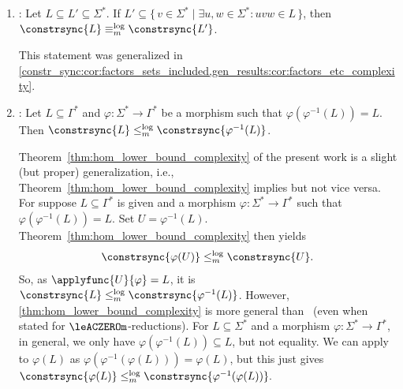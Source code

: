 \begin{enumerate}
	\item \cite[Thm.~15]{FernauGHHVW19}: Let $L\subseteq L'\subseteq\Sigma^*$. If  $L'\subseteq\{\,v\in \Sigma^*\mid \exists u,w \in \Sigma^*: uvw\in L\,\}$, then $\constrsync{L} \equiv^{\log}_m \constrsync{L'}$.
	
	This statement was generalized in \cref{constr_sync:cor:factors_sets_included,gen_results:cor:factors_etc_complexity}.
		
	\item \cite[Thm.~27]{FernauGHHVW19}:
	Let $L\subseteq\Gamma^*$ and $\varphi : \Sigma^* \to \Gamma^*$
	be a morphism such that $\varphi(\varphi^{-1}(L))=L$. Then
	$\constrsync{L} \leq^{\log}_m \constrsync{\varphi^{-1}(L)}$.
	
	Theorem~\ref{thm:hom_lower_bound_complexity} of the present work is a slight (but proper) generalization,
	i.e., Theorem~\ref{thm:hom_lower_bound_complexity} implies \cite[Thm.~27]{FernauGHHVW19}
	but not vice versa.
	For suppose $L \subseteq \Gamma^*$ is given and
	a morphism $\varphi : \Sigma^* \to \Gamma^*$
	such that $\varphi(\varphi^{-1}(L)) = L$.
	Set $U = \varphi^{-1}(L)$.
	Theorem~\ref{thm:hom_lower_bound_complexity}
	then yields
	\[
	\constrsync{\varphi(U)} \le_m^{\log} \constrsync{U}.
	\]
	So, as $\applyfunc{U}{\varphi} = L$, it is
	$\constrsync{L}  \le_m^{\log}
	\constrsync{\varphi^{-1}(L)}$.
	However, \cref{thm:hom_lower_bound_complexity} 
	is more general than~\cite[Thm.~27]{FernauGHHVW19} (even 
	when stated for $\leACZEROm$-reductions).
	For $L \subseteq \Sigma^*$ and
	a morphism $\varphi \colon \Sigma^* \to \Gamma^*$, in general,
	we only have $\varphi(\varphi^{-1}(L)) \subseteq L$,
	but not equality.
	We can apply~\cite[Thm.~27]{FernauGHHVW19}
	to $\varphi(L)$ as $\varphi(\varphi^{-1}(\varphi(L))) = \varphi(L)$,
	but this just gives
	$
	\constrsync{\varphi(L)} \le_m^{\log} \constrsync{\varphi^{-1}(\varphi(L))}.
	$
	

\end{enumerate}

